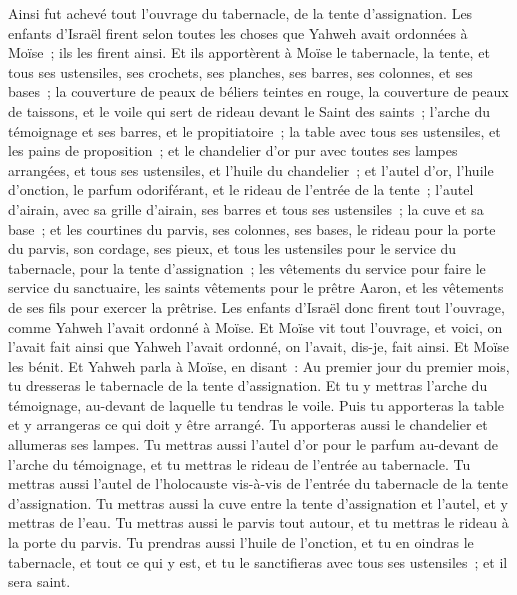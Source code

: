 \begin{multicols}{2}
Ainsi fut achevé tout l'ouvrage du tabernacle, de la tente d'assignation. Les enfants d'Israël firent selon toutes les choses que Yahweh avait ordonnées à Moïse~; ils les firent ainsi.
Et ils apportèrent à Moïse le tabernacle, la tente, et tous ses ustensiles, ses crochets, ses planches, ses barres, ses colonnes, et ses bases~;
la couverture de peaux de béliers teintes en rouge, la couverture de peaux de taissons, et le voile qui sert de rideau devant le Saint des saints~;
l'arche du témoignage et ses barres, et le propitiatoire~;
la table avec tous ses ustensiles, et les pains de proposition~;
et le chandelier d'or pur avec toutes ses lampes arrangées, et tous ses ustensiles, et l'huile du chandelier~;
et l'autel d'or, l'huile d'onction, le parfum odoriférant, et le rideau de l'entrée de la tente~;
l'autel d'airain, avec sa grille d'airain, ses barres et tous ses ustensiles~; la cuve et sa base~;
et les courtines du parvis, ses colonnes, ses bases, le rideau pour la porte du parvis, son cordage, ses pieux, et tous les ustensiles pour le service du tabernacle, pour la tente d'assignation~;
les vêtements du service pour faire le service du sanctuaire, les saints vêtements pour le prêtre Aaron, et les vêtements de ses fils pour exercer la prêtrise.
Les enfants d'Israël donc firent tout l'ouvrage, comme Yahweh l'avait ordonné à Moïse.
Et Moïse vit tout l'ouvrage, et voici, on l'avait fait ainsi que Yahweh l'avait ordonné, on l'avait, dis-je, fait ainsi. Et Moïse les bénit.
\VerseOne{}Et Yahweh parla à Moïse, en disant~:
Au premier jour du premier mois, tu dresseras le tabernacle de la tente d'assignation.
Et tu y mettras l'arche du témoignage, au-devant de laquelle tu tendras le voile.
Puis tu apporteras la table et y arrangeras ce qui doit y être arrangé. Tu apporteras aussi le chandelier et allumeras ses lampes.
Tu mettras aussi l'autel d'or pour le parfum au-devant de l'arche du témoignage, et tu mettras le rideau de l'entrée au tabernacle.
Tu mettras aussi l'autel de l'holocauste vis-à-vis de l'entrée du tabernacle de la tente d'assignation.
Tu mettras aussi la cuve entre la tente d'assignation et l'autel, et y mettras de l'eau.
Tu mettras aussi le parvis tout autour, et tu mettras le rideau à la porte du parvis.
Tu prendras aussi l'huile de l'onction, et tu en oindras le tabernacle, et tout ce qui y est, et tu le sanctifieras avec tous ses ustensiles~; et il sera saint.

\end{multicols}
